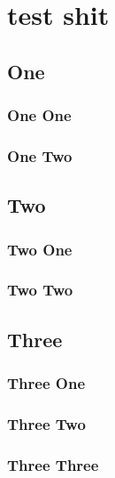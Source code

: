 
\chapter{test shit}
\label{chap:test-shit}

\section{One}
\subsection{One One}
\subsection{One Two}
\section{Two}
\subsection{Two One}
\subsection{Two Two}
\section{Three}
\subsection{Three One}
\subsection{Three Two}
\subsection{Three Three}

